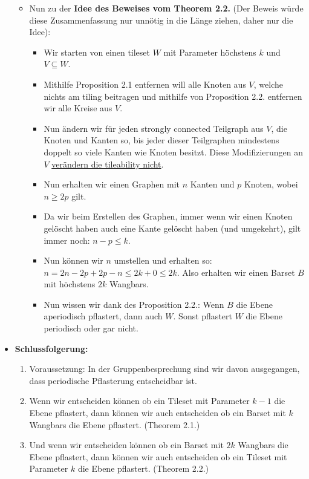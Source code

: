 \begin{itemize}
\begin{itemize}
        \item Nun zu der \textbf{Idee des Beweises vom Theorem 2.2.} (Der Beweis würde diese Zusammenfassung nur unnötig in die Länge ziehen, daher nur die Idee):
        \begin{itemize}
            \item Wir starten von einen tileset $W$ mit Parameter höchstens $k$ und $V \subseteq W$.
            \item Mithilfe Proposition 2.1 entfernen will alle Knoten aus $V$, welche nichts am tiling beitragen und mithilfe von Proposition 2.2. entfernen wir alle Kreise aus $V$.
            \item Nun ändern wir für jeden strongly connected Teilgraph aus $V$, die Knoten und Kanten so, bis jeder dieser Teilgraphen mindestens doppelt so viele Kanten wie Knoten besitzt.
            Diese Modifizierungen an $V$ \underline{verändern die tileability nicht}.
            \item Nun erhalten wir einen Graphen mit $n$ Kanten und $p$ Knoten, wobei $n \geq 2p$ gilt.
            \item Da wir beim Erstellen des Graphen, immer wenn wir einen Knoten gelöscht haben auch eine Kante gelöscht haben (und umgekehrt), gilt immer noch: $n - p \leq k$.
            \item Nun können wir $n$ umstellen und erhalten so: $n = 2n - 2p + 2p - n \leq 2k + 0 \leq 2k$. Also erhalten wir einen Barset $B$ mit höchstens $2k$ Wangbars.
            \item Nun wissen wir dank des Proposition 2.2.: Wenn $B$ die Ebene aperiodisch pflastert, dann auch $W$. Sonst pflastert $W$ die Ebene periodisch oder gar nicht.
        \end{itemize}
        
    \end{itemize}
    
    
    \item \textbf{Schlussfolgerung:}
    \begin{enumerate}
        \item[] Voraussetzung: In der Gruppenbesprechung sind wir davon ausgegangen, dass periodische Pflasterung entscheidbar ist.
        \item Wenn wir entscheiden können ob ein Tileset mit Parameter $k-1$ die Ebene pflastert, dann können wir auch entscheiden ob ein Barset mit $k$ Wangbars die Ebene pflastert. (Theorem 2.1.)
        \item Und wenn wir entscheiden können ob ein Barset mit $2k$ Wangbars die Ebene pflastert, dann können wir auch entscheiden ob ein Tileset mit Parameter $k$ die Ebene pflastert. (Theorem 2.2.)
    \end{enumerate}


    
\end{itemize}





